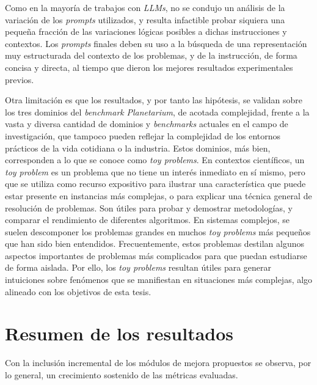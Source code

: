 Como en la mayoría de trabajos con \textit{LLMs}, no se condujo un análisis de la variación de los \textit{prompts} utilizados, y resulta infactible probar siquiera una pequeña fracción de las variaciones lógicas posibles a dichas instrucciones y contextos. Los \textit{prompts} finales deben su uso a la búsqueda de una representación muy estructurada del contexto de los problemas, y de la instrucción, de forma concisa y directa, al tiempo que dieron los mejores resultados experimentales previos.

Otra limitación es que los resultados, y por tanto las hipótesis, se validan sobre los tres dominios del \textit{benchmark} \textit{Planetarium}, de acotada complejidad, frente a la vasta y diversa cantidad de dominios y \textit{benchmarks} actuales en el campo de investigación, que tampoco pueden reflejar la complejidad de los entornos prácticos de la vida cotidiana o la industria. Estos dominios, más bien, corresponden a lo que se conoce como \textit{toy problems}. En contextos científicos, un \textit{toy problem} es un problema que no tiene un interés inmediato en sí mismo, pero que se utiliza como recurso expositivo para ilustrar una característica que puede estar presente en instancias más complejas, o para explicar una técnica general de resolución de problemas. Son útiles para probar y demostrar metodologías, y comparar el rendimiento de diferentes algoritmos. En sistemas complejos, se suelen descomponer los problemas grandes en muchos \textit{toy problems} más pequeños que han sido bien entendidos. Frecuentemente, estos problemas destilan algunos aspectos importantes de problemas más complicados para que puedan estudiarse de forma aislada. Por ello, los \textit{toy problems} resultan útiles para generar intuiciones sobre fenómenos que se manifiestan en situaciones más complejas, algo alineado con los objetivos de esta tesis.

\section{Resumen de los resultados}
Con la inclusión incremental de los módulos de mejora propuestos se observa, por lo general, un crecimiento sostenido de las métricas evaluadas.

